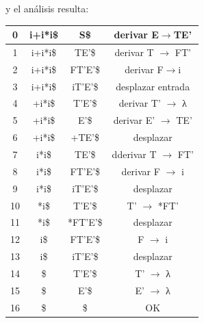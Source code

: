 \documentclass{apuntes}
\begin{document}
\begin{example}
y el análisis resulta:
\begin{center}
\begin{tabular}{| c | c | c | c |}
\hline
0 & i+i*i\$ & S\$ & derivar E$\rightarrow$TE' \\
\hline
1 & i+i*i\$ &  TE'\$ & derivar T $\rightarrow$ FT' \\
\hline
2 & i+i*i\$ &  FT'E'\$ & derivar F$\rightarrow$i \\
\hline
3 & i+i*i\$ &  iT'E'\$ & desplazar entrada \\
\hline
4 & +i*i\$ &  T'E'\$ & derivar T' $\rightarrow$ λ \\
\hline
5 & +i*i\$ &  E'\$ & derivar E' $\rightarrow$ TE' \\
\hline
6 & +i*i\$ &  +TE'\$ & desplazar \\
\hline
7 & i*i\$ &  TE'\$ & dderivar T $\rightarrow$ FT' \\
\hline
8 & i*i\$ &  FT'E'\$ & derivar F $\rightarrow$ i \\
\hline
9 & i*i\$ &  iT'E'\$ & desplazar \\
\hline
10 & *i\$ &  T'E'\$ & T' $\rightarrow$ *FT' \\
\hline
11 & *i\$ &  *FT'E'\$ & desplazar \\
\hline
12 & i\$ &  FT'E'\$ & F $\rightarrow$ i \\
\hline
13 & i\$ &  iT'E'\$ & desplazar \\
\hline
14 & \$ &  T'E'\$ & T' $\rightarrow$ λ \\
\hline
15 & \$ &  E'\$ & E' $\rightarrow$ λ \\
\hline
16 & \$ &  \$ & OK \\
\hline
\end{tabular}
\end{center}
\end{example}
\end{document}
